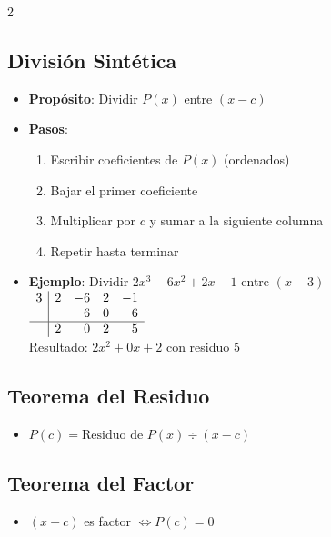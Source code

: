 \begin{multicols}{2}
              \subsection*{División Sintética}
              \begin{itemize}[leftmargin=*]

                \item \textbf{Propósito}: Dividir $P(x)$ entre $(x - c)$
                \item \textbf{Pasos}:
                  \begin{enumerate}
                    \item Escribir coeficientes de $P(x)$ (ordenados)
                    \item Bajar el primer coeficiente
                    \item Multiplicar por $c$ y sumar a la siguiente columna
                    \item Repetir hasta terminar
                  \end{enumerate}

                \item \textbf{Ejemplo}:
                  Dividir $2x^3 - 6x^2 + 2x - 1$ entre $(x-3)$ \\
                  $
                  \begin{array}{r|rrrr}
                    3 & 2 & -6 & 2 & -1 \\
                    &   & 6 & 0 & 6 \\
                    \hline
                    & 2 & 0 & 2 & 5 \\
                  \end{array}$ \\
                  Resultado: $2x^2 + 0x + 2$ con residuo $5$
              \end{itemize}

              \subsection*{Teorema del Residuo}
              \begin{itemize}[leftmargin=*]
                \item $P(c) = \text{Residuo de } P(x) \div (x - c)$
              \end{itemize}

              \subsection*{Teorema del Factor}
              \begin{itemize}[leftmargin=*]
                \item $(x - c)$ es factor $\iff P(c) = 0$
              \end{itemize}


\end{multicols}
